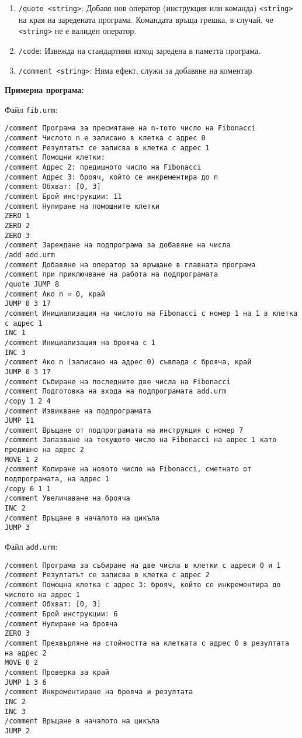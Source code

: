 \documentclass[12pt,a4paper]{article}
\newcommand{\code}[1]{\texttt{#1}}
\begin{document}
{\begin{enumerate}
    Операторите на $P$ да се добавят последователно към края на заредената в паметта програма.
    \item \code{/quote <string>}: Добавя нов оператор (инструкция или команда) \code{<string>} на края на заредената програма. Командата връща грешка, в случай, че \code{<string>} не е валиден оператор.
    \item \code{/code}: Извежда на стандартния изход заредена в паметта програма.
    \item \code{/comment <string>}: Няма ефект, служи за добавяне на коментар
    \end{enumerate}

    \textbf{Примерна програма:}

Файл \code{fib.urm}:
\begin{verbatim}
/comment Програма за пресмятане на n-тото число на Fibonacci
/comment Числото n е записано в клетка с адрес 0
/comment Резултатът се записва в клетка с адрес 1
/comment Помощни клетки:
/comment Адрес 2: предишното число на Fibonacci
/comment Адрес 3: брояч, който се инкрементира до n
/comment Обхват: [0, 3]
/comment Брой инструкции: 11
/comment Нулиране на помощните клетки
ZERO 1
ZERO 2
ZERO 3
/comment Зареждане на подпрограма за добавяне на числа
/add add.urm
/comment Добавяне на оператор за връщане в главната програма
/comment при приключване на работа на подпрограмата
/quote JUMP 8
/comment Ако n = 0, край
JUMP 0 3 17
/comment Инициализация на числото на Fibonacci с номер 1 на 1 в клетка с адрес 1
INC 1
/comment Инициализация на брояча с 1
INC 3
/comment Ако n (записано на адрес 0) съвпада с брояча, край
JUMP 0 3 17
/comment Събиране на последните две числа на Fibonacci
/comment Подготовка на входа на подпрограмата add.urm
/copy 1 2 4
/comment Извикване на подпрограмата
JUMP 11
/comment Връщане от подпрограмата на инструкция с номер 7
/comment Запазване на текущото число на Fibonacci на адрес 1 като предишно на адрес 2
MOVE 1 2
/comment Копиране на новото число на Fibonacci, сметнато от подпрограмата, на адрес 1
/copy 6 1 1
/comment Увеличаване на брояча
INC 2
/comment Връщане в началото на цикъла
JUMP 3
\end{verbatim}

Файл \code{add.urm}:
\begin{verbatim}
/comment Програма за събиране на две числа в клетки с адреси 0 и 1
/comment Резултатът се записва в клетка с адрес 2
/comment Помощна клетка с адрес 3: брояч, който се инкрементира до числото на адрес 1
/comment Обхват: [0, 3]
/comment Брой инструкции: 6
/comment Нулиране на брояча
ZERO 3
/comment Прехвърляне на стойността на клетката с адрес 0 в резултата на адрес 2
MOVE 0 2
/comment Проверка за край
JUMP 1 3 6
/comment Инкрементиране на брояча и резултата
INC 2
INC 3
/comment Връщане в началото на цикъла
JUMP 2
\end{verbatim}

}
\end{document}

